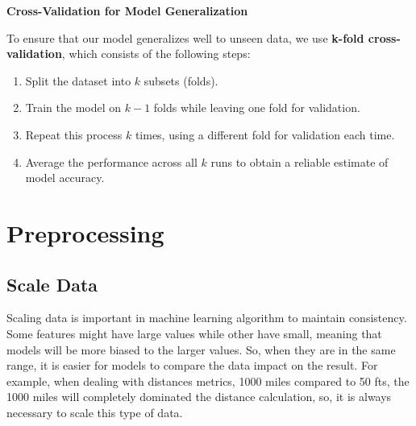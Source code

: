 \begin{center}
\end{center}


\textbf{Cross-Validation for Model Generalization}

To ensure that our model generalizes well to unseen data, we use \textbf{k-fold cross-validation}, which consists of the following steps:

\begin{enumerate}
    \item Split the dataset into \( k \) subsets (folds).
    \item Train the model on \( k-1 \) folds while leaving one fold for validation.
    \item Repeat this process \( k \) times, using a different fold for validation each time.
    \item Average the performance across all \( k \) runs to obtain a reliable estimate of model accuracy.
\end{enumerate}


\section{Preprocessing} 

\subsection{Scale Data}
Scaling data is important in machine learning algorithm to maintain consistency.
Some features might have large values while other have small, meaning that models will
be more biased to the larger values. So, when they are in the same range, it is easier for
models to compare the data impact on the result. For example, when dealing with distances metrics, 
1000 miles compared to 50 fts, the 1000 miles will completely dominated the distance calculation, so, it
is always necessary to scale this type of data.


